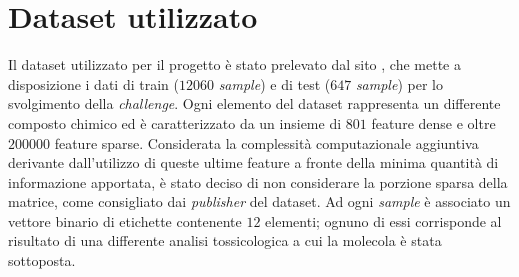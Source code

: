 \section{Dataset utilizzato}
Il dataset utilizzato per il progetto è stato prelevato dal sito \cite{dataset_site}, che mette a disposizione i dati di train ($12060$ \textit{sample}) e di test ($647$ \textit{sample}) per lo svolgimento della \textit{challenge}.
Ogni elemento del dataset rappresenta un differente composto chimico ed è caratterizzato da un insieme di $801$ feature dense e oltre $200000$ feature sparse. Considerata la complessità computazionale aggiuntiva derivante dall'utilizzo di queste ultime feature a fronte della minima quantità di informazione apportata, è stato deciso di non considerare la porzione sparsa della matrice, come consigliato dai \textit{publisher} del dataset.
Ad ogni \textit{sample} è associato un vettore binario di etichette contenente $12$ elementi; ognuno di essi corrisponde al risultato di una differente analisi tossicologica a cui la molecola è stata sottoposta.

